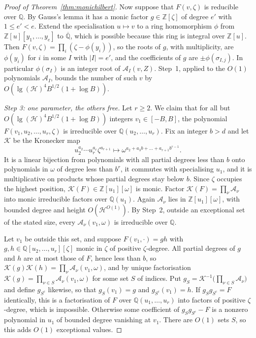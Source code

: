 \documentclass[11pt]{article}
\theoremstyle{definition}
\theoremstyle{remark}
\begin{document}
\begin{proof}[Proof of Theorem~\ref{thm:monichilbert}]
Now suppose that $F(v,\zeta)$ is reducible over $\mathbb Q$. By Gauss's lemma it has
a monic factor $g\in\mathbb Z[\zeta]$ of degree $e'$ with $1\le e'<e$. Extend the specialisation
$u\mapsto v$ to a ring homomorphism $\phi$ from $\mathbb Z[u][y_1,\dots,y_e]$ to
$\overline{\mathbb Q}$, which is possible because this ring is integral over
$\mathbb Z[u]$. Then $F(v,\zeta)=\prod_i(\zeta-\phi(y_i))$, so the roots of $g$, with
multiplicity, are $\phi(y_i)$ for $i$ in some $I$ with $|I|=e'$, and the
coefficients of $g$ are $\pm\phi(\sigma_{I,j})$. In particular $\phi(\sigma_I)$ is
an integer root of $\mathcal A_I(v,Z)$. Step~1, applied to the $O(1)$ polynomials $\mathcal A_I$,
bounds the number of such $v$ by $O(\operatorname{lg}(\mathcal H)^4B^{1/2}(1+\log B))$.

\emph{Step 3: one parameter, the others free.} Let $r\ge2$. We claim that for
all but $O(\operatorname{lg}(\mathcal H)^4B^{1/2}(1+\log B))$ integers $v_1\in[-B,B]$, the
polynomial $F(v_1,u_2,\dots,u_r,\zeta)$ is irreducible over $\mathbb Q(u_2,\dots,u_r)$.
Fix an integer $b>d$ and let $\mathcal K$ be the Kronecker map
\[
 u_2^{a_2}\cdots u_r^{a_r}\zeta^{a_{r+1}}\longmapsto\omega^{a_2+a_3b+\dots+a_{r+1}b^{r-1}}.
\]
It is a
linear bijection from polynomials with all partial degrees less than $b$ onto
polynomials in $\omega$ of degree less than $b^r$, it commutes with specialising
$u_1$, and it is multiplicative on products whose partial degrees stay below $b$.
Since $\zeta$ occupies the highest position, $\mathcal K(F)\in\mathbb Z[u_1][\omega]$ is monic.
Factor $\mathcal K(F)=\prod_\nu \mathcal A_\nu$ into monic irreducible factors over
$\mathbb Q(u_1)$. Again $\mathcal A_\nu$ lies in $\mathbb Z[u_1][\omega]$, with bounded
degree and height $O(\mathcal H^{O(1)})$. By Step~2, outside an exceptional set of the stated size, every
$\mathcal A_\nu(v_1,\omega)$ is irreducible over $\mathbb Q$.

Let $v_1$ be outside this set, and suppose
$F(v_1,\cdot)=gh$ with $g,h\in\mathbb Q[u_2,\dots,u_r][\zeta]$ monic in $\zeta$ of positive
$\zeta$-degree. All partial degrees of $g$ and $h$ are at most those of $F$, hence
less than $b$, so $\mathcal K(g)\mathcal K(h)=\prod_\nu \mathcal A_\nu(v_1,\omega)$, and by unique
factorisation $\mathcal K(g)=\prod_{\nu\in S}\mathcal A_\nu(v_1,\omega)$ for some set $S$ of
indices. Put $g_S=\mathcal K^{-1}\bigl(\prod_{\nu\in S}\mathcal A_\nu\bigr)$ and define
$g_{S^c}$ likewise, so that $g_S(v_1)=g$ and $g_{S^c}(v_1)=h$. If
$g_Sg_{S^c}=F$ identically, this is a factorisation of $F$ over
$\mathbb Q(u_1,\dots,u_r)$ into factors of positive $\zeta$-degree, which is impossible.
Otherwise some coefficient of $g_Sg_{S^c}-F$ is a nonzero polynomial in $u_1$ of
bounded degree vanishing at $v_1$. There are $O(1)$ sets $S$, so this adds
$O(1)$ exceptional values.


\end{proof}
\end{document}
